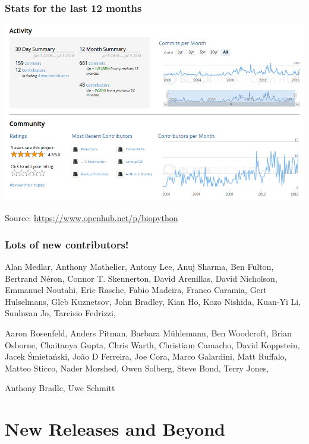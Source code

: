 \documentclass[trans]{beamer}
\begin{document}
{
  \frametitle{Stats for the last 12 months}


  \begin{center}
  \includegraphics[width=1.0\textwidth]{openhub-bp-activity-community.png}
  \end{center}
  \small{Source: \url{https://www.openhub.net/p/biopython}}
}
\frame
{
  \frametitle{Lots of new contributors!}
  Alan Medlar, Anthony Mathelier, Antony Lee, Anuj Sharma, Ben Fulton, Bertrand Néron, Connor T. Skennerton, David Arenillas, David Nicholson, Emmanuel Noutahi, Eric Rasche, Fabio Madeira, Franco Caramia, Gert Hulselmans, Gleb Kuznetsov, John Bradley, Kian Ho, Kozo Nishida, Kuan-Yi Li, Sunhwan Jo, Tarcisio Fedrizzi,

  Aaron Rosenfeld, Anders Pitman, Barbara Mühlemann, Ben Woodcroft, Brian Osborne, Chaitanya Gupta, Chris Warth, Christiam Camacho, David Koppstein, Jacek Śmietański, João D Ferreira, Joe Cora, Marco Galardini, Matt Ruffalo, Matteo Sticco, Nader Morshed, Owen Solberg, Steve Bond, Terry Jones,

  Anthony Bradle, Uwe Schmitt
}


\section{New Releases and Beyond}
\end{document}
